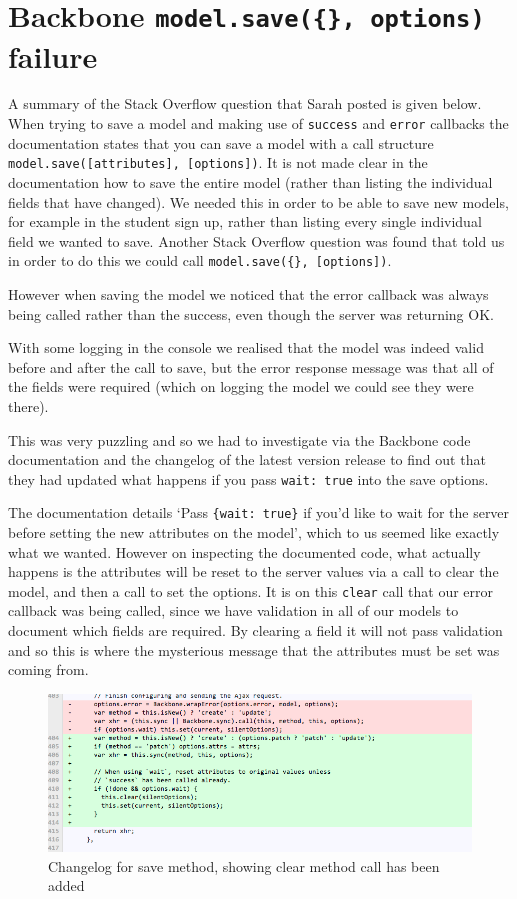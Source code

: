 \section{Backbone \texttt{model.save(\{\}, options)} failure}
A summary of the Stack Overflow question\cite{so_model_save} that Sarah posted is given below.
When trying to save a model and making use of \verb!success! and \verb!error! callbacks the documentation states that you can save a model with a call structure \verb!model.save([attributes], [options])!. 
It is not made clear in the documentation how to save the entire model (rather than listing the individual fields that have changed). We needed this in order to be able to save new models, for example in the student sign up, rather than listing every single individual field we wanted to save.
Another Stack Overflow question\cite{so_save_all_fields} was found that told us in order to do this we could call \verb!model.save({}, [options])!.

However when saving the model we noticed that the error callback was always being called rather than the success, even though the server was returning OK.

With some logging in the console we realised that the model was indeed valid before and after the call to save, but the error response message was that all of the fields were required (which on logging the model we could see they were there).

This was very puzzling and so we had to investigate via the Backbone code documentation\cite{backbone_code} and the changelog of the latest version release\cite{backbone_change_log} to find out that they had updated what happens if you pass \verb!wait: true! into the save options.

The documentation details `Pass \verb!{wait: true}! if you'd like to wait for the server before setting the new attributes on the model', which to us seemed like exactly what we wanted. 
However on inspecting the documented code, what actually happens is the attributes will be reset to the server values via a call to clear the model, and then a call to set the options.
It is on this \verb!clear! call that our error callback was being called, since we have validation in all of our models
to document which fields are required. By clearing a field it will not pass validation and so this is where the mysterious message that the attributes must be set was coming from.

\begin{figure}[H]\centering
\includegraphics[scale=0.5]{images/appendix/backbone_changelog}
\caption{Changelog for save method, showing clear method call has been added}
\end{figure}

